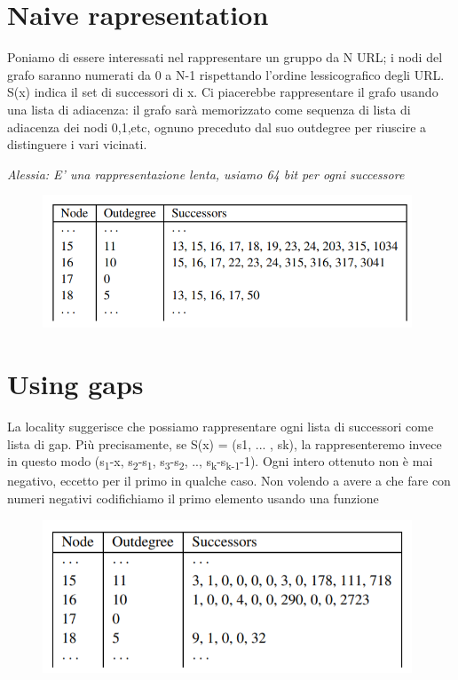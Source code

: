 \documentclass[12pt,italian]{report}
\begin{document}
\section{Naive rapresentation}
\label{Naive}
Poniamo di essere interessati nel rappresentare un gruppo da N URL; i nodi del grafo saranno numerati da 0 a N-1 rispettando l'ordine lessicografico degli URL. S(x) indica il set di successori di x. Ci piacerebbe rappresentare il grafo usando una lista di adiacenza: il grafo sarà memorizzato come sequenza di lista di adiacenza dei nodi 0,1,etc, ognuno preceduto dal suo outdegree per riuscire a distinguere i vari vicinati. 

\noindent \textit{Alessia: E' una rappresentazione lenta, usiamo 64 bit per ogni successore}
\begin{figure}[h]
	\centering
	\includegraphics[width=110mm]{image/graphcomp2.png}
	\label{fig:ef1}
\end{figure}

\section{Using gaps}
\label{gaps}
La locality suggerisce che possiamo rappresentare ogni lista di successori come lista di gap. Più precisamente, se S(x) = (s1, ... , sk), la rappresenteremo invece in questo modo (s\textsubscript{1}-x,  s\textsubscript{2}-s\textsubscript{1}, s\textsubscript{3}-s\textsubscript{2}, .., s\textsubscript{k}-s\textsubscript{k-1}-1). Ogni intero ottenuto non è mai negativo, eccetto per il primo in qualche caso. Non volendo a avere a che fare con numeri negativi codifichiamo il primo elemento usando una funzione

\begin{figure}[h]
	\centering
	\includegraphics[width=110mm]{image/graphcomp1.png}
	\label{fig:ef1}
\end{figure}
\end{document}
